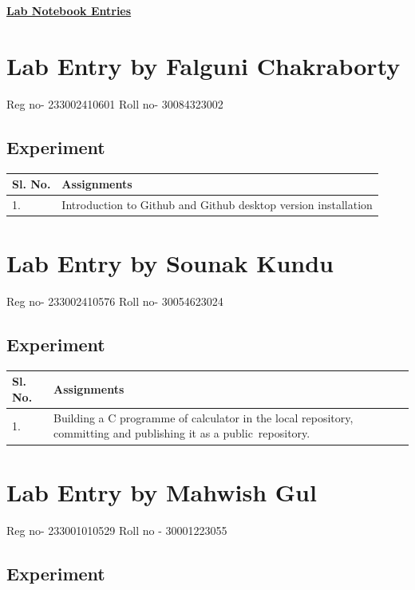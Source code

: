 \documentclass[12pt, a4paper]{article}
\begin{document}
\centering

\begin{center}
\Large{\bfseries\underline{Lab Notebook Entries}}
\end{center}

\section{Lab Entry by Falguni Chakraborty}
Reg no- 233002410601
Roll no- 30084323002

\subsection{Experiment}


\begin{table}[ht]
\centering
\begin{tabular}{|p{50pt}|p{200pt}|}
\hline
\textbf{Sl. No.} & \textbf{Assignments} \\ \hline
1. & Introduction to Github and Github desktop version installation \\ \hline
\end{tabular}
\end{table}

\section{Lab Entry by Sounak Kundu}
Reg no- 233002410576
Roll no- 30054623024
\subsection{Experiment}


\begin{table}[ht]
\centering
\begin{tabular}{|p{50pt}|p{200pt}|}
\hline
\textbf{Sl. No.} & \textbf{Assignments} \\ \hline
1. & Building a C programme of calculator in the local repository, committing and publishing it as a public repository. \\ \hline
\end{tabular}
\end{table}

\section{Lab Entry by Mahwish Gul}
Reg no- 233001010529
Roll no - 30001223055
\subsection{Experiment}
\end{document}
